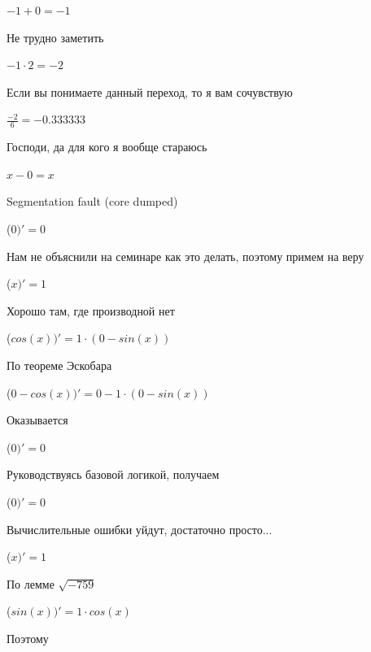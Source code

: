 \documentclass[12pt,a4paper,fleqn]{article}
\begin{document}
\begin{center}
\end{center}
\begin{center}$-1+0 = -1$\end{center}
Не трудно заметить

\begin{center}
\end{center}
\begin{center}$-1 \cdot 2 = -2$\end{center}
Если вы понимаете данный переход, то я вам сочувствую

\begin{center}
\end{center}
\begin{center}$\frac{-2}{6} = -0.333333$\end{center}
Господи, да для кого я вообще стараюсь

\begin{center}
$x-0 = x$\end{center}
Segmentation fault (core dumped)

\begin{center}
 ($0)'
  = 0$\end{center}
Нам не объяснили на семинаре как это делать, поэтому примем на веру

\begin{center}
 ($x)'
  = 1$\end{center}
Хорошо там, где производной нет\cite{link2}

\begin{center}
 ($cos(x))'
  = 1 \cdot (0-sin(x))$\end{center}
По теореме Эскобара

\begin{center}
 ($0-cos(x))'
  = 0-1 \cdot (0-sin(x))$\end{center}
Оказывается

\begin{center}
 ($0)'
  = 0$\end{center}
Руководствуясь базовой логикой, получаем

\begin{center}
 ($0)'
  = 0$\end{center}
Вычислительные ошибки уйдут, достаточно просто...

\begin{center}
 ($x)'
  = 1$\end{center}
По лемме $\sqrt{-759}$
\begin{center}
 ($sin(x))'
  = 1 \cdot cos(x)$\end{center}
Поэтому
\end{document}
